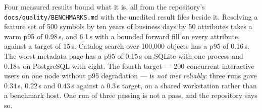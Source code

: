 \documentclass[11pt,a4paper]{article}
\renewcommand{\_}{\oldunderscore\allowbreak}
\theoremstyle{plain}
\theoremstyle{definition}
\theoremstyle{definition}
\theoremstyle{remark}
\begin{document}
Four measured results bound what it is, all from the repository's \texttt{docs/quality/BENCHMARKS.md} with the
unedited result files beside it. Resolving a feature set of 500 symbols by ten years of business days by
50 attributes takes a warm p95 of 0.98\,s, and 6.1\,s with a bounded forward fill on every attribute,
against a target of 15\,s. Catalog search over 100{,}000 objects has a p95 of 0.16\,s. The worst metadata
page has a p95 of 0.15\,s on SQLite with one process and 0.18\,s on PostgreSQL with eight. The fourth
target --- 200 concurrent interactive users on one node without p95 degradation --- is \emph{not met
reliably}: three runs gave 0.34\,s, 0.22\,s and 0.43\,s against a 0.3\,s target, on a shared workstation
rather than a benchmark host. One run of three passing is not a pass, and the repository says so.
\end{document}
